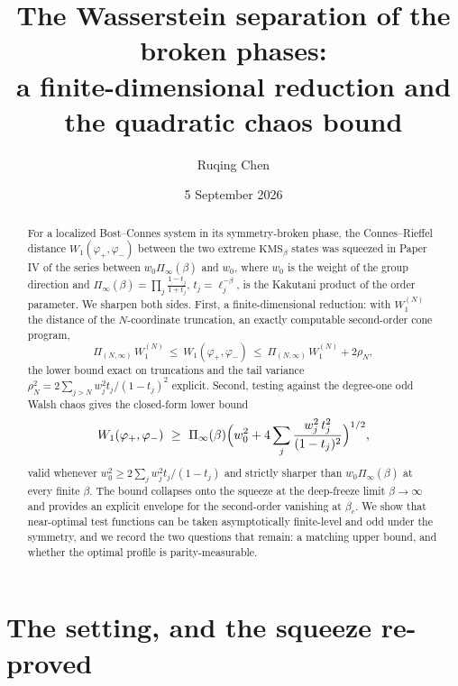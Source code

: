 \documentclass[11pt]{amsart}
\title[The Wasserstein separation of the broken phases]{The Wasserstein separation of the broken phases:\\ a finite-dimensional reduction and the quadratic chaos bound}
\author{Ruqing Chen}
\date{5 September 2026}
\theoremstyle{remark}
\begin{document}
\begin{abstract}
For a localized Bost--Connes system in its symmetry-broken phase, the Connes--Rieffel
distance $W_1(\varphi_+,\varphi_-)$ between the two extreme $\mathrm{KMS}_\beta$ states was
squeezed in Paper IV of the series between $w_0\Pi_\infty(\beta)$ and $w_0$, where $w_0$ is
the weight of the group direction and $\Pi_\infty(\beta)=\prod_j\frac{1-t_j}{1+t_j}$,
$t_j=\ell_j^{-\beta}$, is the Kakutani product of the order parameter. We sharpen both
sides. First, a finite-dimensional reduction: with $W_1^{(N)}$ the distance of the
$N$-coordinate truncation, an exactly computable second-order cone program,
\[
\Pi_{(N,\infty)}\,W_1^{(N)}\ \le\ W_1(\varphi_+,\varphi_-)\ \le\
\Pi_{(N,\infty)}\,W_1^{(N)}+2\rho_N,
\]
the lower bound exact on truncations and the tail variance
$\rho_N^2=2\sum_{j>N}w_j^2t_j/(1-t_j)^2$ explicit. Second,
testing against the degree-one odd Walsh chaos gives the closed-form lower bound
\[
W_1(\varphi_+,\varphi_-)\ \ge\
\Pi_\infty(\beta)\Bigl(w_0^2+4\sum_{j}\frac{w_j^2\,t_j^2}{(1-t_j)^2}\Bigr)^{1/2},
\]
valid whenever $w_0^2\ge2\sum_jw_j^2t_j/(1-t_j)$ and strictly sharper than
$w_0\Pi_\infty(\beta)$ at every finite $\beta$. The bound collapses onto the squeeze at the
deep-freeze limit $\beta\to\infty$ and provides an explicit envelope for the second-order
vanishing at $\beta_c$. We show that near-optimal test functions can be taken asymptotically
finite-level and odd under the symmetry, and we record the two questions that remain: a
matching upper bound, and whether the optimal profile is parity-measurable.
\end{abstract}

\maketitle

\section{The setting, and the squeeze re-proved}\label{sec:setting}
\end{document}
